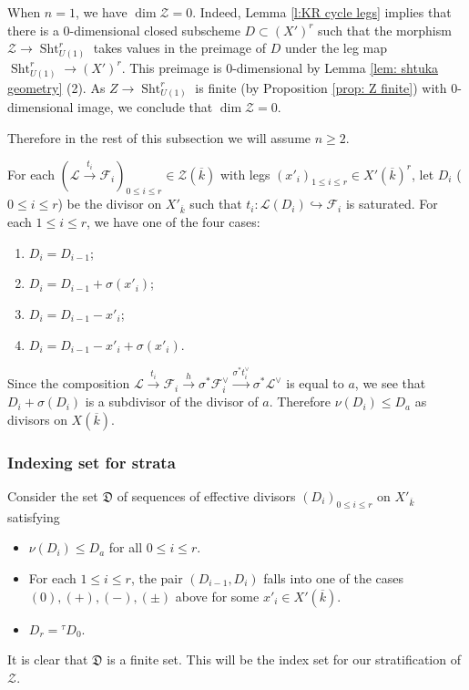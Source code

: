 \documentclass[reqno]{amsart}
\numberwithin{equation}{section}
\DeclareMathOperator{\Sht}{Sht}
\newcommand{\incl}{\hookrightarrow}
\newcommand{\ov}{\overline}
\newcommand\xr{\xrightarrow}
\newcommand{\s}{\sigma}
\renewcommand{\t}{\tau}
\newcommand\cF{\mathcal{F}}
\newcommand\cL{\mathcal{L}}
\newcommand\cZ{\mathcal{Z}}
\newcommand\frD{\mathfrak{D}}
\theoremstyle{remark}
\numberwithin{equation}{section}
\begin{document}
When $n=1$, we have $\dim \cZ  =0$. Indeed, Lemma \ref{l:KR cycle legs} implies that there is a $0$-dimensional closed subscheme $D \subset (X')^r$ such that the morphism $\cZ \rightarrow \Sht_{U(1)}^r$ takes values in the preimage of $D$ under the leg map $\Sht_{U(1)}^r \rightarrow (X')^r$. This preimage is $0$-dimensional by Lemma \ref{lem: shtuka geometry} (2). As $Z \rightarrow \Sht_{U(1)}^r$ is finite (by Proposition \ref{prop: Z finite}) with 0-dimensional image, we conclude that $\dim \cZ = 0$. 

Therefore in the rest of this subsection we will assume $n\ge2$. 
 
For each $(\cL\xr{t_{i}}\cF_{i})_{0\le i\le r}\in \cZ(\ov k)$ with legs $(x'_{i})_{1\le i\le r}\in X'(\ov k)^{r}$, let $D_{i}$ ($0\le i\le r$) be the divisor on $X'_{\ov k}$ such that $t_{i}: \cL(D_{i})\incl \cF_{i}$ is saturated. For each $1\le i\le r$, we have one of the  four cases:
\begin{enumerate}
\item[(0)] $D_{i}=D_{i-1}$;
\item[(+)] $D_{i}=D_{i-1}+\s(x'_{i})$;
\item[($-$)] $D_{i}=D_{i-1}-x'_{i}$;
\item[($\pm$)] $D_{i}=D_{i-1}-x'_{i}+\s(x'_{i})$.
\end{enumerate}
Since the composition $\cL\xr{t_{i}}\cF_{i}\xr{h}\s^{*}\cF_{i}^{\vee}\xr{\s^{*}t_{i}^{\vee}}\s^{*}\cL^{\vee}$ is equal to $a$, we see that $D_{i}+\s(D_{i})$ is a subdivisor of the divisor of $a$. Therefore $\nu(D_{i})\le D_{a}$ as divisors on $X(\ov{k})$. 

\subsubsection{Indexing set for strata} Consider the set $\frD$ of sequences of effective divisors $(D_{i})_{0\le i\le r}$ on $X'_{\ov{k}}$ satisfying
\begin{itemize}
\item $\nu(D_{i})\le D_{a}$ for all $0\le i\le r$.
\item For each $1\le i\le r$, the pair $(D_{i-1}, D_{i})$ falls into one of the cases $(0),(+),(-),(\pm)$ above for some $x'_{i}\in X'(\ov k)$.
\item $D_{r}={}^{\t}D_{0}$.
\end{itemize}
It is clear that $\frD$ is a finite set. This will be the index set for our stratification of $\cZ$. 
\end{document}
